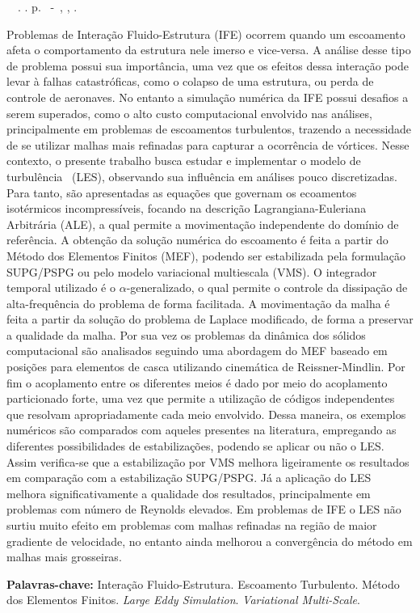 \setlength{\absparsep}{18pt} %
\begin{resumo}
	\begin{flushleft}
		\setlength{\absparsep}{0pt} %
		\SingleSpacing
		\imprimirautorabr~~\textbf{\imprimirtituloresumo}.	\imprimirdata. \pageref{LastPage} p.
		\imprimirtipotrabalho~-~\imprimirinstituicao, \imprimirlocal, \imprimirdata.
	\end{flushleft}
	\OnehalfSpacing

	Problemas de Interação Fluido-Estrutura (IFE) ocorrem quando um escoamento afeta o comportamento da estrutura nele imerso e vice-versa. A análise desse tipo de problema possui sua importância, uma vez que os efeitos dessa interação pode levar à falhas catastróficas, como o colapso de uma estrutura, ou perda de controle de aeronaves. No entanto a simulação numérica da IFE possui desafios a serem superados, como o alto custo computacional envolvido nas análises, principalmente em problemas de escoamentos turbulentos, trazendo a necessidade de se utilizar malhas mais refinadas para capturar a ocorrência de vórtices. Nesse contexto, o presente trabalho busca estudar e implementar o modelo de turbulência \LES\ (LES), observando sua influência em análises pouco discretizadas. Para tanto, são apresentadas as equações que governam os ecoamentos isotérmicos incompressíveis, focando na descrição Lagrangiana-Euleriana Arbitrária (ALE), a qual permite a movimentação independente do domínio de referência. A obtenção da solução numérica do escoamento é feita a partir do Método dos Elementos Finitos (MEF), podendo ser estabilizada pela formulação SUPG/PSPG ou pelo modelo variacional multiescala (VMS). O integrador temporal utilizado é o $\alpha$-generalizado, o qual permite o controle da dissipação de alta-frequência do problema de forma facilitada. A movimentação da malha é feita a partir da solução do problema de Laplace modificado, de forma a preservar a qualidade da malha. Por sua vez os problemas da dinâmica dos sólidos computacional são analisados seguindo uma abordagem do MEF baseado em posições para elementos de casca utilizando cinemática de Reissner-Mindlin. Por fim o acoplamento entre os diferentes meios é dado por meio do acoplamento particionado forte, uma vez que permite a utilização de códigos independentes que resolvam apropriadamente cada meio envolvido. Dessa maneira, os exemplos numéricos são comparados com aqueles presentes na literatura, empregando as diferentes possibilidades de estabilizações, podendo se aplicar ou não o LES. Assim verifica-se que a estabilização por VMS melhora ligeiramente os resultados em comparação com a estabilização SUPG/PSPG. Já a aplicação do LES melhora significativamente a qualidade dos resultados, principalmente em problemas com número de Reynolds elevados. Em problemas de IFE o LES não surtiu muito efeito em problemas com malhas refinadas na região de maior gradiente de velocidade, no entanto ainda melhorou a convergência do método em malhas mais grosseiras.

	\textbf{Palavras-chave:} Interação Fluido-Estrutura. Escoamento Turbulento. Método dos Elementos Finitos. \textit{Large Eddy Simulation}. \textit{Variational Multi-Scale}.
\end{resumo}